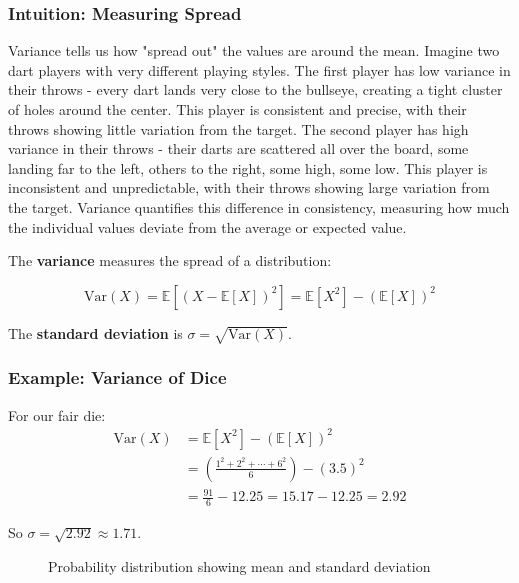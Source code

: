 \subsubsection{Intuition: Measuring Spread}

Variance tells us how "spread out" the values are around the mean. Imagine two dart players with very different playing styles. The first player has low variance in their throws - every dart lands very close to the bullseye, creating a tight cluster of holes around the center. This player is consistent and precise, with their throws showing little variation from the target. The second player has high variance in their throws - their darts are scattered all over the board, some landing far to the left, others to the right, some high, some low. This player is inconsistent and unpredictable, with their throws showing large variation from the target. Variance quantifies this difference in consistency, measuring how much the individual values deviate from the average or expected value.

The \textbf{variance} measures the spread of a distribution:

\begin{equation}
\text{Var}(X) = \mathbb{E}[(X - \mathbb{E}[X])^2] = \mathbb{E}[X^2] - (\mathbb{E}[X])^2
\end{equation}

The \textbf{standard deviation} is $\sigma = \sqrt{\text{Var}(X)}$.

\subsubsection{Example: Variance of Dice}

For our fair die:
\begin{align}
\text{Var}(X) &= \mathbb{E}[X^2] - (\mathbb{E}[X])^2 \\
&= \left(\frac{1^2 + 2^2 + \cdots + 6^2}{6}\right) - (3.5)^2 \\
&= \frac{91}{6} - 12.25 = 15.17 - 12.25 = 2.92
\end{align}

So $\sigma = \sqrt{2.92} \approx 1.71$.

\begin{figure}[h]
\centering
{}
\caption{Probability distribution showing mean and standard deviation}
\label{fig:dice-variance}
\end{figure}


